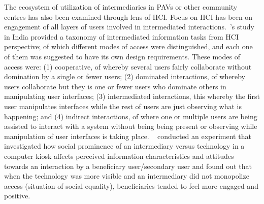 The ecosystem of utilization of intermediaries in PAVs or other community centres has also been examined through lens of HCI. Focus on HCI has been on engagement of all layers of users involved in intermediated interactions.~\cite{parikh2006}'s study in India provided a taxonomy of intermediated information tasks from HCI perspective;  of which  different modes of access were distinguished, and each one of them was suggested to have its own design requirements. These modes of access were: (1) cooperative, of whereby several users fairly collaborate without domination by a single or fewer users; (2) dominated interactions, of whereby users collaborate but they is one or fewer users who dominate others in manipulating user interfaces; (3) intermediated interactions, this whereby the first user manipulates interfaces while the  rest of users are just observing what is happening; and (4) indirect interactions, of where one or multiple users are being assisted to interact with a system without being being present or observing while manipulation of user interfaces is taking place. ~\cite{sukumaran2009intermediated} conducted an experiment that investigated how social prominence of an intermediary versus technology in a computer kiosk affects perceived information characteristics and attitudes towards an interaction by a beneficiary user/secondary user and found out that when the technology was more visible and an intermediary did not monopolize access (situation of social equality), beneficiaries tended to feel more engaged and positive. 

